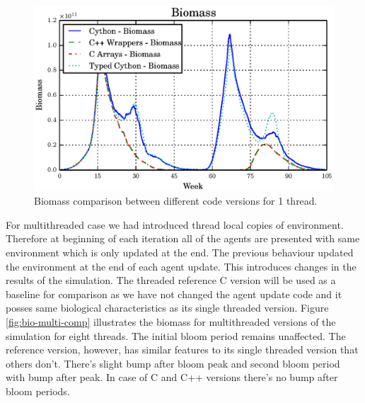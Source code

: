 \documentclass[12pt, a4paper]{report}
\begin{document}
\begin{figure}[H]
  \begin{center}
    \includegraphics[width=\columnwidth]{graphs/bio-single-comp.eps}
    \caption{Biomass comparison between different code versions for 1 thread.}
    \label{fig:bio-single-comp}
  \end{center}
\end{figure}

For multithreaded case we had introduced thread local copies of environment. Therefore
at beginning of each iteration all of the agents are presented with same environment
which is only updated at the end. The previous behaviour updated the environment at
the end of each agent update. This introduces changes in the results of the simulation.
The threaded reference C version will be used as a baseline for comparison as we have
not changed the agent update code and it posses same biological characteristics as
its single threaded version. Figure \ref{fig:bio-multi-comp} illustrates the biomass
for multithreaded versions of the simulation for eight threads. The initial bloom
period remains unaffected. The reference version, however, has similar features
to its single threaded version that others don't. There's slight bump after
bloom peak and second bloom period with bump after peak. In case of C and C++ versions
there's no bump after bloom periods.
\end{document}
